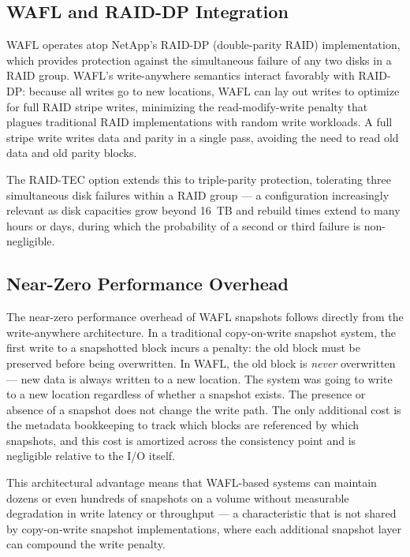 \subsection{WAFL and RAID-DP Integration}

WAFL operates atop NetApp's RAID-DP (double-parity RAID) implementation, which provides protection against the simultaneous failure of any two disks in a RAID group. WAFL's write-anywhere semantics interact favorably with RAID-DP: because all writes go to new locations, WAFL can lay out writes to optimize for full RAID stripe writes, minimizing the read-modify-write penalty that plagues traditional RAID implementations with random write workloads. A full stripe write writes data and parity in a single pass, avoiding the need to read old data and old parity blocks.

The RAID-TEC option extends this to triple-parity protection, tolerating three simultaneous disk failures within a RAID group --- a configuration increasingly relevant as disk capacities grow beyond 16~TB and rebuild times extend to many hours or days, during which the probability of a second or third failure is non-negligible.

\subsection{Near-Zero Performance Overhead}

The near-zero performance overhead of WAFL snapshots follows directly from the write-anywhere architecture. In a traditional copy-on-write snapshot system, the first write to a snapshotted block incurs a penalty: the old block must be preserved before being overwritten. In WAFL, the old block is \emph{never} overwritten --- new data is always written to a new location. The system was going to write to a new location regardless of whether a snapshot exists. The presence or absence of a snapshot does not change the write path. The only additional cost is the metadata bookkeeping to track which blocks are referenced by which snapshots, and this cost is amortized across the consistency point and is negligible relative to the I/O itself.

This architectural advantage means that WAFL-based systems can maintain dozens or even hundreds of snapshots on a volume without measurable degradation in write latency or throughput --- a characteristic that is not shared by copy-on-write snapshot implementations, where each additional snapshot layer can compound the write penalty.

